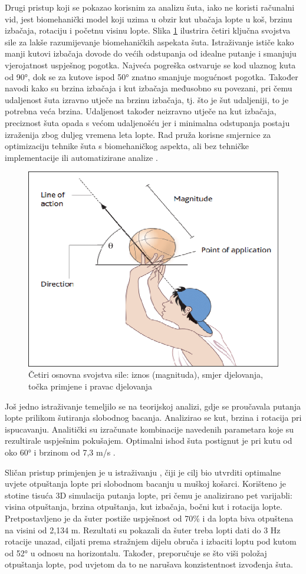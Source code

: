 \documentclass[zavrsnirad]{fer}
\begin{document}
Drugi pristup koji se pokazao korisnim za analizu šuta, iako ne koristi računalni vid, jest biomehanički model koji uzima u obzir kut ubačaja lopte u koš, brzinu izbačaja, rotaciju i početnu visinu lopte. 
Slika \ref{fig:forces} ilustrira četiri ključna svojstva sile za lakše razumijevanje biomehaničkih aspekata šuta. 
Istraživanje ističe kako manji kutovi izbačaja dovode do većih odstupanja od idealne putanje i smanjuju vjerojatnost uspješnog pogotka. 
Najveća pogreška ostvaruje se kod ulaznog kuta od 90°, dok se za kutove ispod 50° znatno smanjuje mogućnost pogotka. 
Također navodi kako su brzina izbačaja i kut izbačaja međusobno su povezani, pri čemu udaljenost šuta izravno utječe na brzinu izbačaja, tj. što je šut udaljeniji, to je potrebna veća brzina. 
Udaljenost također neizravno utječe na kut izbačaja, preciznost šuta opada s većom udaljenošću jer i minimalna odstupanja postaju izraženija zbog duljeg vremena leta lopte.
Rad pruža korisne smjernice za optimizaciju tehnike šuta s biomehaničkog aspekta, ali bez tehničke implementacije ili automatizirane analize \cite{article}.
\begin{figure}[H]
  \centering
  \includegraphics[width=0.6\linewidth]{Figures/The-four-properties-of-force-Hede-Russell-Weatherby-2011.png}
  \caption{Četiri osnovna svojstva sile: iznos (magnituda), smjer djelovanja, točka primjene i pravac djelovanja \cite{article}}
  \label{fig:forces}
\end{figure}
Još jedno istraživanje temeljilo se na teorijskoj analizi, gdje se proučavala putanja lopte prilikom šutiranja slobodnog bacanja.
Analizirao se kut, brzina i rotacija pri ispucavanju. 
Analitički su izračunate kombinacije navedenih parametara koje su rezultirale uspješnim pokušajem.
Optimalni ishod šuta postignut je pri kutu od oko 60° i brzinom od 7,3 m/s \cite{Hamilton1997}.

Sličan pristup primjenjen je u istraživanju \cite{Tran2008}, čiji je cilj bio utvrditi optimalne uvjete otpuštanja lopte pri slobodnom bacanju u muškoj košarci.
Korišteno je stotine tisuća 3D simulacija putanja lopte, pri čemu je analizirano pet varijabli: visina otpuštanja, brzina otpuštanja, kut izbačaja, bočni kut i rotacija lopte.
Pretpostavljeno je da šuter postiže uspješnost od 70\% i da lopta biva otpuštena na visini od 2,134 m.
Rezultati su pokazali da šuter treba lopti dati do 3 Hz rotacije unazad, ciljati prema stražnjem dijelu obruča i izbaciti loptu pod kutom od 52° u odnosu na horizontalu. 
Također, preporučuje se što viši položaj otpuštanja lopte, pod uvjetom da to ne narušava konzistentnost izvođenja šuta.
\end{document}
